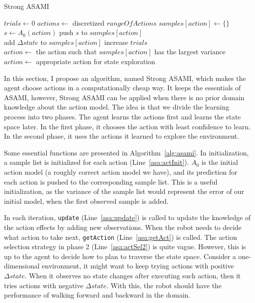 \documentclass[12pt]{article}
\begin{document}
\begin{algorithm*}
\caption{Strong ASAMI}\label{alg:asami}
\begin{algorithmic}[1]
    \State $trials\gets 0$
    \State $actions \gets$ discretized $rangeOfActions$
        \State $samples[action] \gets \{\}$ \label{asa:actInit}
        \State $s \gets A_0(action)$
	\State push $s$ to $samples[action]$
    \EndFor
\EndFunction
\\
 \label{asa:update}
    \State add $\Delta state$ to $samples[action]$
    \State increase $trials$
\EndFunction
\\
 \label{asa:getAct}
        \State $action \gets$ the action such that $samples[action]$ has the largest variance
    \Else
        \State $action \gets$ appropriate action for state exploration \label{asa:actSel2}
    \EndIf
\EndFunction
\end{algorithmic}
\end{algorithm*}

In this section, I propose an algorithm, named Strong ASAMI,
which makes the agent choose actions in a computationally cheap way.
It keeps the essentials of ASAMI, however, Strong ASAMI can be applied
when there is no prior domain knowledge about the action model. The
idea is that we divide the learning process into two phases. The agent
learns the actions first and learns the state space later. In the
first phase, it chooses the action with least confidence to learn. In
the second phase, it uses the actions it learned to explore the
environment.

Some essential functions are presented in Algorithm~\ref{alg:asami}.
In initialization, a sample list is initialized for each action
(Line~\ref{asa:actInit}). $A_0$ is the initial action model (a roughly
correct action model we have), and its prediction for each action is
pushed to the corresponding sample list.  This is a useful
initialization, as the variance of the sample list would represent
the error of our initial model, when the first observed sample is
added.

In each iteration, \texttt{update} (Line~\ref{asa:update}) is called to update
the knowledge of the action effects by adding new observations. When
the robot needs to decide what action to take next,
\texttt{getAction} (Line~\ref{asa:getAct}) is called.
The action selection strategy in phase 2 (Line~\ref{asa:actSel2}) is
quite vague. However, this is up to the agent to decide how to plan to traverse
the state space. Consider a one-dimensional environment, it might want
to keep trying actions with positive $\Delta state$. When it observes
no state changes after executing such action, then it tries actions
with negative $\Delta state$. With this, the robot should have the
performance of walking forward and backward in the domain.
\end{document}
